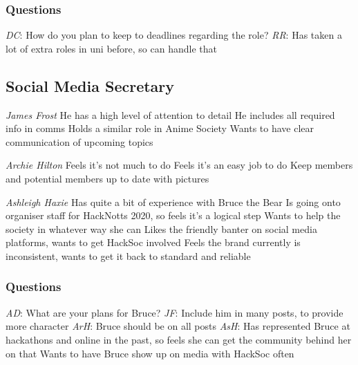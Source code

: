\documentclass[11pt]{meetingmins}
\begin{document}
\subsubsection{Questions}
\begin{items}
	\item
	\textit{DC}: How do you plan to keep to deadlines regarding the role?
		\subitem
		\textit{RR}:
			\subsubitem
			Has taken a lot of extra roles in uni before, so can handle that	
\end{items}

\subsection{Social Media Secretary}
\begin{items}
	\item
	\textit{James Frost}
		\subitem
		He has a high level of attention to detail
		\subitem
		He includes all required info in comms
		\subitem
		Holds a similar role in Anime Society
		\subitem
		Wants to have clear communication of upcoming topics
	
	\item
	\textit{Archie Hilton}
		\subitem
		Feels it’s not much to do
		\subitem
		Feels it’s an easy job to do
		\subitem
		Keep members and potential members up to date with pictures
	
	\item
	\textit{Ashleigh Haxie}
		\subitem
		Has quite a bit of experience with Bruce the Bear
		\subitem
		Is going onto organiser staff for HackNotts 2020, so feels it’s a logical step
		\subitem
		Wants to help the society in whatever way she can
		\subitem
		Likes the friendly banter on social media platforms, wants to get HackSoc involved
		\subitem
		Feels the brand currently is inconsistent, wants to get it back to standard and reliable
\end{items}

\subsubsection{Questions}
\begin{items}
	\item
	\textit{AD}: What are your plans for Bruce?	
		\subitem
		\textit{JF}:
			\subsubitem
			Include him in many posts, to provide more character
		\subitem
		\textit{ArH}:
			\subsubitem
			Bruce should be on all posts
		\subitem
		\textit{AsH}:
			\subsubitem
			Has represented Bruce at hackathons and online in the past, so feels she can get the community behind her on that
			\subsubitem
			Wants to have Bruce show up on media with HackSoc often
\end{items}
\end{document}
